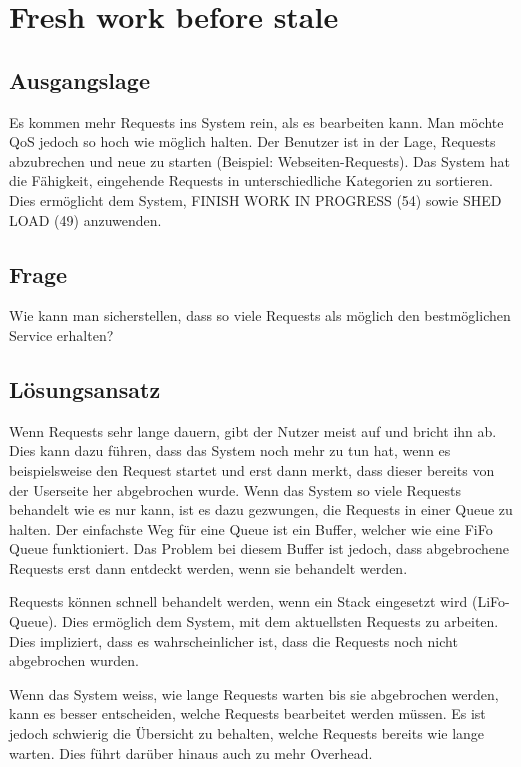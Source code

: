 \section{Fresh work before stale}

\subsection{Ausgangslage}


Es kommen mehr Requests ins System rein, als es bearbeiten kann. Man möchte QoS jedoch so hoch wie möglich halten.
Der Benutzer ist in der Lage, Requests abzubrechen und neue zu starten (Beispiel: Webseiten-Requests).
Das System hat die Fähigkeit, eingehende Requests in unterschiedliche Kategorien zu sortieren. Dies ermöglicht dem System, FINISH WORK IN PROGRESS (54) sowie SHED LOAD (49) anzuwenden.

\subsection{Frage}


Wie kann man sicherstellen, dass so viele Requests als möglich den bestmöglichen Service erhalten?

\subsection{Lösungsansatz}


Wenn Requests sehr lange dauern, gibt der Nutzer meist auf und bricht ihn ab. Dies kann dazu führen, dass das System noch mehr zu tun hat, wenn es beispielsweise den Request startet und erst dann merkt, dass dieser bereits von der Userseite her abgebrochen wurde.
Wenn das System so viele Requests behandelt wie es nur kann, ist es dazu gezwungen, die Requests in einer Queue zu halten. Der einfachste Weg für eine Queue ist ein Buffer, welcher wie eine FiFo Queue funktioniert. Das Problem bei diesem Buffer ist jedoch, dass abgebrochene Requests erst dann entdeckt werden, wenn sie behandelt werden.

Requests können schnell behandelt werden, wenn ein Stack eingesetzt wird (LiFo-Queue). Dies ermöglich dem System, mit dem aktuellsten Requests zu arbeiten. Dies impliziert, dass es wahrscheinlicher ist, dass die Requests noch nicht abgebrochen wurden.

Wenn das System weiss, wie lange Requests warten bis sie abgebrochen werden, kann es besser entscheiden, welche Requests bearbeitet werden müssen. Es ist jedoch schwierig die Übersicht zu behalten, welche Requests bereits wie lange warten. Dies führt darüber hinaus auch zu mehr Overhead.
